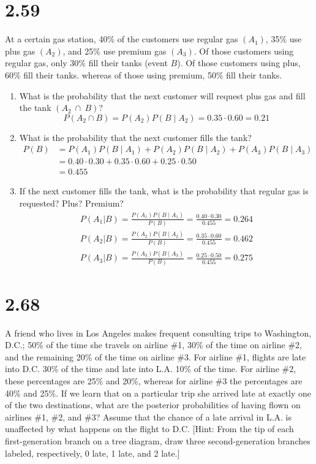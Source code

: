 \documentclass[letterpaper,12pt,fleqn]{article}
\begin{document}
\section*{2.59}

At a certain gas station, 40\% of the customers use regular gas \((A_1)\), 35\% use plus gas \((A_2)\), and 25\% use
premium gas \((A_3)\).  Of those customers using regular gas, only 30\% fill their tanks (event \(B\)).  Of those customers
using plus, 60\% fill their tanks. whereas of those using premium, 50\% fill their tanks.

\begin{enumerate}[label={\alph*)}]
\item What is the probability that the next customer will request plus gas and fill the tank \((A_2~\cap~B)\)?
  \[P(A_2\cap B)=P(A_2)P(B\mid A_2)=0.35\cdot0.60=0.21\]

\item What is the probability that the next customer fills the tank?
  \begin{align*}
    P(B) &= P(A_1)P(B\mid A_1)+P(A_2)P(B\mid A_2)+P(A_3)P(B\mid A_3) \\
    &= 0.40\cdot0.30+0.35\cdot0.60+0.25\cdot0.50 \\
    &= 0.455
  \end{align*}

\item If the next customer fills the tank, what is the probability that regular gas is requested? Plus? Premium?
  \begin{gather*}
    P(A_1|B)=\frac{P(A_1)P(B\mid A_1)}{P(B)}=\frac{0.40\cdot0.30}{0.455}=0.264 \\
    P(A_2|B)=\frac{P(A_2)P(B\mid A_2)}{P(B)}=\frac{0.35\cdot0.60}{0.455}=0.462 \\
    P(A_3|B)=\frac{P(A_3)P(B\mid A_3)}{P(B)}=\frac{0.25\cdot0.50}{0.455}=0.275
  \end{gather*}
\end{enumerate}

\section*{2.68}

A friend who lives in Los Angeles makes frequent consulting trips to Washington, D.C.; 50\% of the time she travels on
airline \#1, 30\% of the time on airline \#2, and the remaining 20\% of the time on airline \#3.  For airline \#1, flights
are late into D.C. 30\% of the time and late into L.A. 10\% of the time.  For airline \#2, these percentages are 25\% and
20\%, whereas for airline \#3 the percentages are 40\% and 25\%.  If we learn that on a particular trip she arrived late at
exactly one of the two destinations, what are the posterior probabilities of having flown on airlines \#1, \#2, and \#3?
Assume that the chance of a late arrival in L.A. is unaffected by what happens on the flight to D.C.  [Hint: From the tip of
each first-generation branch on a tree diagram, draw three second-generation branches labeled, respectively, 0 late, 1 late,
and 2 late.]
\end{document}

